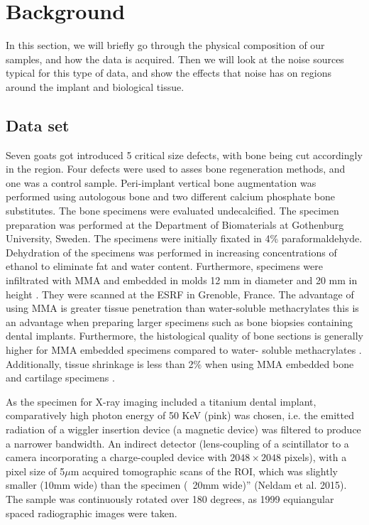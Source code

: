 \section{Background}
\label{sec:background}

In this section, we will briefly go through the physical composition of our samples, and how the
data is acquired. Then we will look at the noise sources typical for this type of data, and show
the effects that noise has on regions around the implant and biological tissue.

\subsection{Data set}


Seven goats got introduced 5 critical size defects, with bone being cut accordingly in the region.
 Four defects were used to asses bone regeneration methods, and one was a control sample.
 Peri-implant vertical bone augmentation was performed using autologous bone and two different
 calcium phosphate bone substitutes. The bone specimens were evaluated undecalcified. The
 specimen preparation was performed at the Department of Biomaterials at Gothenburg University,
 Sweden. The specimens were initially fixated in 4\% paraformaldehyde. Dehydration of the
 specimens was performed in increasing concentrations of ethanol to eliminate fat and water
 content. Furthermore, specimens were infiltrated with MMA and embedded in molds 12 mm in
 diameter and 20 mm in height . They were scanned at the ESRF
 in Grenoble, France. The advantage of using MMA is greater tissue penetration than water-soluble
 methacrylates this is an advantage when preparing larger specimens such as bone biopsies
 containing dental implants. Furthermore, the histological quality of bone sections is generally
 higher for MMA embedded specimens compared to water- soluble methacrylates .
 Additionally, tissue shrinkage is less than 2\% when using MMA embedded bone and cartilage
 specimens .


As the specimen for X-ray imaging included a titanium dental implant, comparatively high photon
 energy of 50 KeV (pink) was chosen, i.e. the
 emitted radiation of a wiggler insertion device (a
 magnetic device) was filtered    to produce a narrower bandwidth. An indirect detector (lens-coupling
 of a scintillator to a camera incorporating a charge-coupled device with $2048 \times 2048$ pixels),
 with a pixel size of 5$\mu$m acquired tomographic scans of the ROI, which was slightly smaller (10mm wide)
 than the specimen (~20mm wide)” (Neldam et al. 2015). The sample was continuously rotated over
 180 degrees, as 1999 equiangular spaced radiographic images were taken.

